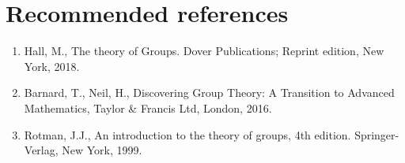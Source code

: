\documentclass[12pt]{article}
\begin{document}
\section{Recommended references}
	\begin{enumerate}
	\item Hall, M., The theory of Groups. Dover Publications; Reprint edition, New York, 2018.
	\item Barnard, T., Neil, H., Discovering Group Theory: A Transition to Advanced Mathematics, Taylor \& Francis Ltd, London, 2016.
	\item Rotman, J.J., An introduction to the theory of groups, 4th edition. Springer-Verlag, New York, 1999.
	\end{enumerate}
\end{document}
